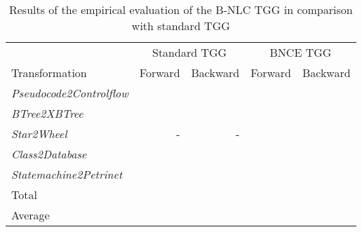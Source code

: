 
\begin{table}[h]
	\centering
	\begin{tabular}{l r r r r }
		\hline
			& \multicolumn{2}{c}{Standard TGG} & \multicolumn{2}{c}{BNCE TGG}\\
		Transformation 					& Forward & Backward & Forward & Backward \\
		\hline
		\emph{Pseudocode2Controlflow}	& 		& 		& 	 	&  \\
		\emph{BTree2XBTree}				&  		& 		& 		&  \\
		\emph{Star2Wheel}				& -		& -		& 	 	&  \\
		\emph{Class2Database}			& 		& 		&  		&   \\
		\emph{Statemachine2Petrinet}	& 		& 		& 		&  \\
		\hline
		Total					&  & 		&	& \\
		Average					&  & 		&	& \\
		\hline
	\end{tabular}
	\caption{Results of the empirical evaluation of the B-NLC TGG in comparison with standard TGG}
	\label{tab:evaluation}
\end{table}